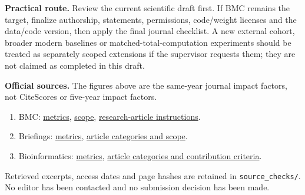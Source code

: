 \documentclass[a4paper,10pt]{article}
\begin{document}
\textbf{Practical route.}
Review the current scientific draft first. If BMC remains the target, finalize
authorship, statements, permissions, code/weight licenses and the data/code
version, then apply the final journal checklist. A new external cohort,
broader modern baselines or matched-total-computation experiments should be
treated as separately scoped extensions if the supervisor requests them;
they are not claimed as completed in this draft.

\textbf{Official sources.}
The figures above are the same-year journal impact factors, not CiteScores or
five-year impact factors.
\begin{enumerate}
\setlength{\itemsep}{1pt}
\item BMC:
\href{https://link.springer.com/journal/12859}{metrics},
\href{https://link.springer.com/journal/12859/aims-and-scope}{scope},
\href{https://link.springer.com/journal/12859/submission-guidelines/research-article}{research-article instructions}.
\item Briefings:
\href{https://academic.oup.com/bib/pages/About}{metrics},
\href{https://academic.oup.com/bib/pages/General_Instructions}{article categories and scope}.
\item Bioinformatics:
\href{https://academic.oup.com/bioinformatics/pages/About}{metrics},
\href{https://academic.oup.com/bioinformatics/pages/General_Instructions}{article categories and contribution criteria}.
\end{enumerate}
Retrieved excerpts, access dates and page hashes are retained in
\texttt{source\_checks/}. No editor has been contacted and no submission
decision has been made.
\end{document}
